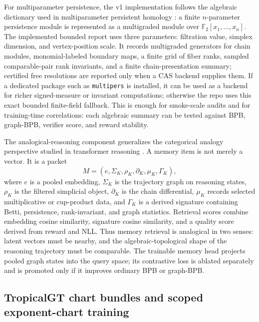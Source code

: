 \documentclass[11pt]{article}
\begin{document}
For multiparameter persistence, the v1 implementation follows the algebraic dictionary used in multiparameter persistent homology \cite{schreiber2022multiparameter}: a finite \(n\)-parameter persistence module is represented as a multigraded module over \(\mathbb F_2[x_1,\ldots,x_n]\).  The implemented bounded report uses three parameters: filtration value, simplex dimension, and vertex-position scale.  It records multigraded generators for chain modules, monomial-labeled boundary maps, a finite grid of fiber ranks, sampled comparable-pair rank invariants, and a finite chain-presentation summary; certified free resolutions are reported only when a CAS backend supplies them.  If a dedicated package such as \texttt{multipers} \cite{loiseaux2024multipers} is installed, it can be used as a backend for richer signed-measure or invariant computations; otherwise the repo uses this exact bounded finite-field fallback.  This is enough for smoke-scale audits and for training-time correlations: each algebraic summary can be tested against BPB, graph-BPB, verifier score, and reward stability.

The analogical-reasoning component generalizes the categorical analogy perspective studied in transformer reasoning \cite{minegishi2026analogical}.  A memory item is not merely a vector.  It is a packet
\[
  M=(e,\Sigma_K,\rho_K,\partial_K,\mu_K,\Gamma_K),
\]
where \(e\) is a pooled embedding, \(\Sigma_K\) is the trajectory graph on reasoning states, \(\rho_K\) is the filtered simplicial object, \(\partial_K\) is the chain differential, \(\mu_K\) records selected multiplicative or cup-product data, and \(\Gamma_K\) is a derived signature containing Betti, persistence, rank-invariant, and graph statistics.  Retrieval scores combine embedding cosine similarity, signature cosine similarity, and a quality score derived from reward and NLL.  Thus memory retrieval is analogical in two senses: latent vectors must be nearby, and the algebraic-topological shape of the reasoning trajectory must be comparable.  The trainable memory head projects pooled graph states into the query space; its contrastive loss is ablated separately and is promoted only if it improves ordinary BPB or graph-BPB.


\subsection{TropicalGT chart bundles and scoped exponent-chart training}
\label{subsec:bundle-toric-training}
\end{document}
